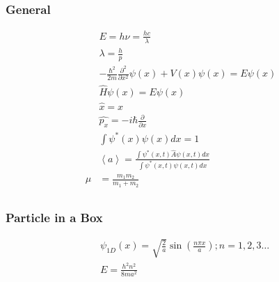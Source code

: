 \subsubsection{General}
\begin{align*}
&E=h\nu = \frac{hc}{\lambda}\\
&\lambda = \frac{h}{p}\\
&-\frac{\hbar^2}{2m} \frac{\partial ^2}{\partial x^2} \psi\left(x\right)+ V\left(x\right)\psi\left(x\right) = E\psi\left(x\right)\\
&\hat{H}\psi\left(x\right) = E\psi\left(x\right)\\
&\hat{x}=x\\
&\hat{p_x}=-i\hbar \frac{\partial}{\partial x}\\
&\int\psi^*\left(x\right)\psi\left(x\right)dx=1\\
&\left<a\right> = \frac{\int\psi^*\left(x,t\right)\hat{A}\psi\left(x,t\right)dx}{\int\psi^*\left(x,t\right)\psi\left(x,t\right)dx}\\
\mu&=\frac{m_1m_2}{m_1+m_2}\\
\end{align*}

\subsubsection{Particle in a Box}
\begin{align*}
&\psi_{1D}\left(x\right) = \sqrt{\frac{2}{a}}\sin \left(\frac{n\pi x}{a} \right); n = 1, 2, 3 \ldots\\
&E=\frac{h^2n^2}{8ma^2}\\
\end{align*}

